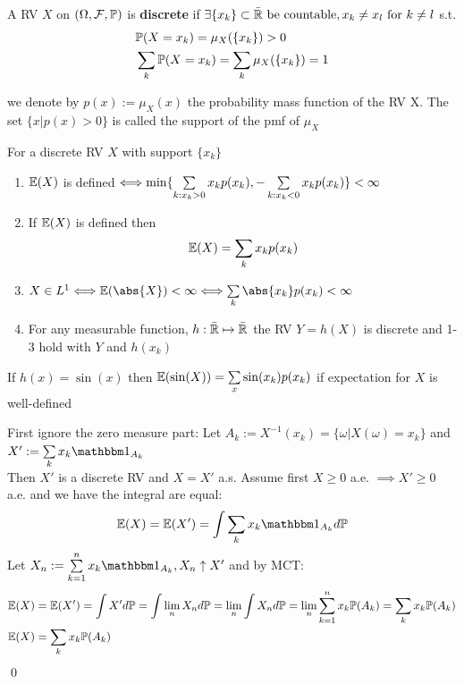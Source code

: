 \begin{dfn}
    A RV $X$ on $(\Omega, \mathcal{F}, \mathbb{P})$ is \textbf{discrete} if $\exists \{x_k\} \subset \bar{\mathbb{R}} \text{ be countable}, x_k \neq x_l \text{ for } k\neq l$ s.t.
    \begin{align*}
        &\mathbb{P}(X=x_k) = \mu_X(\{x_k\}) > 0 \\
        &\sum\limits_{k} \mathbb{P}(X=x_k) = \sum\limits_{k}\mu_X(\{x_k\}) = 1
    \end{align*}
\end{dfn}we denote by $p(x) := \mu_X(x)$ the probability mass function of the RV X. The set $\{x|p(x)>0\}$ is called the support of the pmf of $\mu_X$
\begin{prop}
For a discrete RV $X$ with support $\{x_k\}$
\begin{enumerate}
    \item $\mathbb{E}(X)$ is defined $\Longleftrightarrow \min\{\sum\limits_{k:x_k>0}x_kp(x_k),-\sum\limits_{k:x_k<0}x_kp(x_k)\} < \infty$
    \item If $\mathbb{E}(X)$ is defined then 
    \begin{equation*}
        \mathbb{E}(X) = \sum\limits_{k}x_kp(x_k)
    \end{equation*}
    \item $X\in \ls{1} \Longleftrightarrow \E(\abs{X})<\infty \Longleftrightarrow \bigs{k}\abs{x_k}p(x_k) < \infty$
    \item For any measurable function, $h: \bar{\mathbb{R}} \mapsto \bar{\mathbb{R}}$ the RV $Y = h(X)$ is discrete and 1-3 hold with $Y$ and $h(x_k)$
\end{enumerate}
\end{prop}
\begin{example}
If $h(x) = \sin(x)$ then $\mathbb{E}(\sin(X)) = \sum\limits_{x} \sin(x_k) p(x_k)$ if expectation for $X$ is well-defined
\end{example}
\pf First ignore the zero measure part:  Let $A_k:=X^{-1}(x_k) = \{\omega|X(\omega) = x_k\} $ and $X' := \bigs{k}x_k \I_{A_k}$ \\
Then $X'$ is a discrete RV and $X = X'$ a.s. Assume first $X \geq0$ a.e. $\implies X' \geq 0$ a.e. and we have the integral are equal:
\begin{equation*}
    \E(X) = \E(X') = \int \bigs{k}x_k \I_{A_k}d\prob
\end{equation*}
Let $X_n := \bigs{k=1}^n x_k \I_{A_k}, X_n\uparrow X'$ and by MCT:
\begin{align*}
    \mathbb{E}(X) &= \mathbb{E}(X') = \int X' d\mathbb{P} = \int \lim\limits_{n} X_n d\mathbb{P} = \lim\limits_{n} \int X_n d\mathbb{P} = \lim\limits_{n} \sum\limits_{k=1}^n x_k \mathbb{P}(A_k) = \sum\limits_{k} x_k \mathbb{P}(A_k)\\
    \mathbb{E}(X) &= \sum\limits_{k} x_k \mathbb{P}(A_k)
\end{align*}\qed
